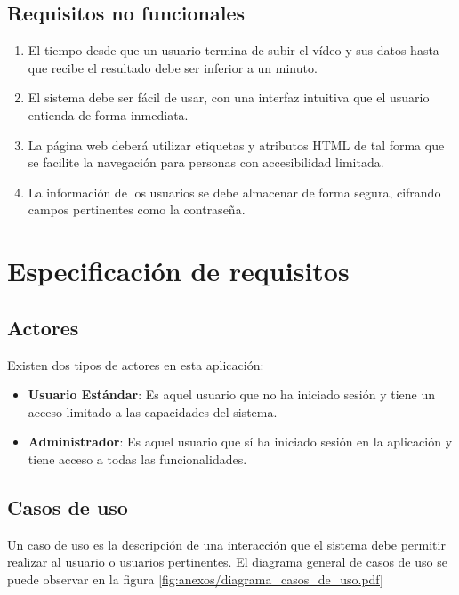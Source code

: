 \subsection{Requisitos no funcionales}

\begin{enumerate}[start=1,label={\bfseries RNF\arabic*:}]
    \item El tiempo desde que un usuario termina de subir el vídeo y sus datos
          hasta que recibe el resultado debe ser inferior a un minuto.
    \item El sistema debe ser fácil de usar, con una interfaz intuitiva que el
          usuario entienda de forma inmediata.
    \item La página web deberá utilizar etiquetas y atributos HTML de tal forma
          que se facilite la navegación para personas con accesibilidad
          limitada.
    \item La información de los usuarios se debe almacenar de forma segura,
          cifrando campos pertinentes como la contraseña.
\end{enumerate}

\section{Especificación de requisitos}

\subsection{Actores}

Existen dos tipos de actores en esta aplicación:

\begin{itemize}
    \item \textbf{Usuario Estándar}: Es aquel usuario que no ha iniciado sesión y
          tiene un acceso limitado a las capacidades del sistema.
    \item \textbf{Administrador}: Es aquel usuario que sí ha iniciado sesión en
          la aplicación y tiene acceso a todas las funcionalidades.
\end{itemize}

\subsection{Casos de uso}

Un caso de uso es la descripción de una interacción que el sistema debe permitir
realizar al usuario o usuarios pertinentes. El diagrama general de casos de uso
se puede observar en la figura \ref{fig:anexos/diagrama_casos_de_uso.pdf}

